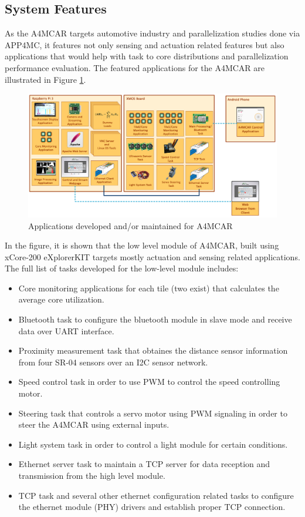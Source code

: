 \subsection{System Features}
As the A4MCAR targets automotive industry and parallelization studies done via APP4MC, it features not only sensing and actuation related features but also applications that would help with task to core distributions and parallelization performance evaluation. The featured applications for the A4MCAR are illustrated in Figure \ref{fig:tasksoverall}. 
\begin{figure}[!ht]
	\centering
	\captionsetup{justification=centering}
	\includegraphics[scale=0.3]{content/images/tasksoverall.png}
	\caption{Applications developed and/or maintained for A4MCAR}
	\label{fig:tasksoverall}
\end{figure}
In the figure, it is shown that the low level module of A4MCAR, built using xCore-200 eXplorerKIT targets mostly actuation and sensing related applications. The full list of tasks developed for the low-level module includes:
\begin{itemize}
	\item Core monitoring applications for each tile (two exist) that calculates the average core utilization.
	\item Bluetooth task to configure the bluetooth module in slave mode and receive data over UART interface.
	\item Proximity measurement task that obtaines the distance sensor information from four SR-04 sensors over an I2C sensor network.
	\item Speed control task in order to use PWM to control the speed controlling motor.
	\item Steering task that controls a servo motor using PWM signaling in order to steer the A4MCAR using external inputs.
	\item Light system task in order to control a light module for certain conditions.
	\item Ethernet server task to maintain a TCP server for data reception and transmission from the high level module.
	\item TCP task and several other ethernet configuration related tasks to configure the ethernet module (PHY) drivers and establish proper TCP connection.
\end{itemize}
